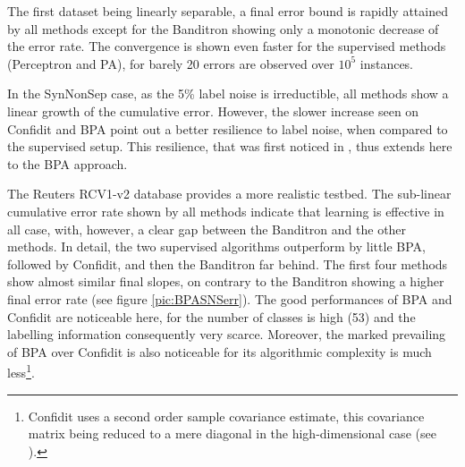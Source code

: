 \documentclass[preprint,12pt,authoryear]{elsarticle}
\begin{document}
The first dataset being linearly separable, a final error bound is rapidly attained by all methods except for the Banditron showing only a monotonic decrease of the error rate. The convergence is shown even faster for the supervised methods (Perceptron and PA), for barely 20 errors are observed over $10^5$ instances. 


In the SynNonSep case, as the  5\% label noise is irreductible, all methods show a linear growth of the cumulative error. However, the slower increase seen on Confidit and BPA  point out a better resilience to label noise, when compared to the supervised setup. This resilience, that was first noticed in \cite{crammer2013multiclass}, thus extends here to the BPA approach.


The Reuters RCV1-v2 database provides a more realistic testbed.
The sub-linear cumulative error rate  shown by all methods indicate that learning is effective in all case, with, however, a clear gap between the Banditron and the other methods. In detail, the two supervised algorithms outperform by little BPA, followed by Confidit, and then the Banditron far behind. The first four methods show almost similar final slopes, on contrary to the Banditron showing a higher final error rate (see figure \ref{pic:BPASNSerr}). The good performances of BPA and Confidit are noticeable here, for the number of classes is high (53) and the labelling information consequently very scarce. 
Moreover, the marked prevailing of BPA over Confidit is also noticeable for its algorithmic complexity is much less\footnote{Confidit uses a second order sample covariance estimate, this covariance matrix being reduced  to a mere diagonal in the high-dimensional case (see  \cite{crammer2013multiclass}).}. 
\end{document}
